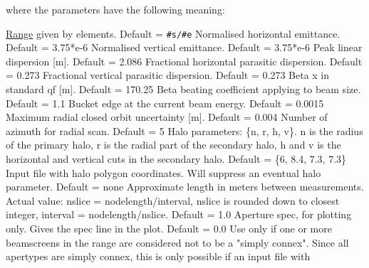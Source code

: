 \begin{5.02.05}
\end{5.02.05}

where the parameters have the following meaning: 
\begin{5.02.04}
\begin{madlist}
    \hyperref[sec:range]{Range} given by
     elements. Default = {\tt \#s/\#e}  
    Normalised horizontal emittance. Default = 3.75*e-6  
    Normalised vertical emittance. Default = 3.75*e-6 
    Peak linear dispersion [m]. Default = 2.086 
    Fractional horizontal parasitic dispersion. Default = 0.273 
    Fractional vertical parasitic dispersion. Default = 0.273 
    Beta x in standard qf [m]. Default = 170.25 
    Beta beating coefficient applying to beam size. Default = 1.1 
    Bucket edge at the current beam energy. Default = 0.0015 
    Maximum radial closed orbit uncertainty [m]. Default = 0.004 
    Number of azimuth for radial scan. Default = 5 
    Halo parameters: \{n, r, h, v\}. n is the radius of the
     primary halo,  r is the radial part of the secondary halo, h and v
     is the horizontal and  vertical cuts in the secondary halo. Default
     = \{6, 8.4, 7.3, 7.3\}  
    Input file with halo polygon coordinates. Will
     suppress  an eventual halo parameter. Default = none  
    Approximate length in meters between
     measurements. Actual value:  nslice = nodelength/interval, nslice
     is rounded down to closest integer,  interval =
     nodelength/nslice. Default = 1.0  
    Aperture spec, for plotting only. Gives the spec line in
     the plot. Default = 0.0  
    Use only if one or more beamscreens in the range are
     considered not to  be a "simply connex". Since all \madx apertypes
     are simply connex, this is only possible  if an input file with

\end{madlist}
\end{5.02.04}
